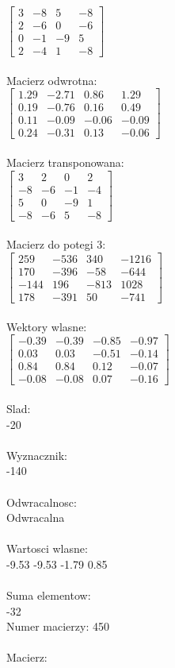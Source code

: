 \documentclass[a4paper,12pt]{article}
\begin{document}
$\begin{bmatrix} 3&-8&5&-8\\2&-6&0&-6\\0&-1&-9&5\\2&-4&1&-8 \end{bmatrix}$
\\
\\
Macierz odwrotna:\\

$\begin{bmatrix} 1.29&-2.71&0.86&1.29\\0.19&-0.76&0.16&0.49\\0.11&-0.09&-0.06&-0.09\\0.24&-0.31&0.13&-0.06 \end{bmatrix}$
\\
\\
Macierz transponowana:\\

$\begin{bmatrix} 3&2&0&2\\-8&-6&-1&-4\\5&0&-9&1\\-8&-6&5&-8 \end{bmatrix}$
\\
\\
Macierz do potegi 3:\\

$\begin{bmatrix} 259&-536&340&-1216\\170&-396&-58&-644\\-144&196&-813&1028\\178&-391&50&-741 \end{bmatrix}$
\\
\\
Wektory wlasne:\\

$\begin{bmatrix} -0.39&-0.39&-0.85&-0.97\\0.03&0.03&-0.51&-0.14\\0.84&0.84&0.12&-0.07\\-0.08&-0.08&0.07&-0.16 \end{bmatrix}$
\\
\\
Slad:\\
-20
\\
\\
Wyznacznik:\\
-140
\\
\\
Odwracalnosc:\\
Odwracalna
\\
\\
Wartosci wlasne:\\
-9.53 -9.53 -1.79 0.85
\\
\\
Suma elementow:\\
-32
\\
\newpage
Numer macierzy:
450
\\
\\
Macierz:\\
\end{document}
